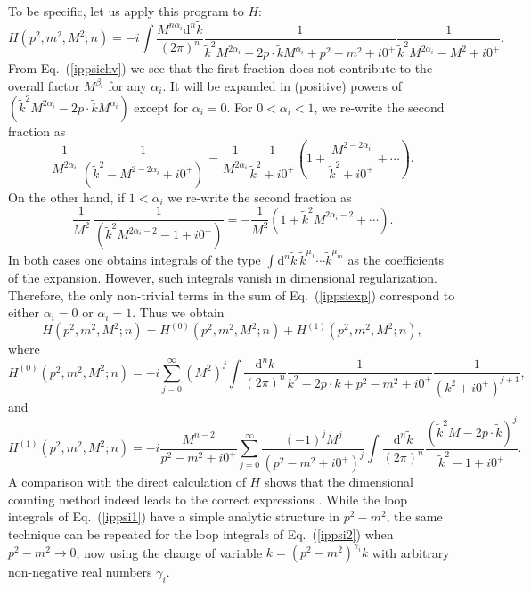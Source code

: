 \documentclass[twoside,12pt]{article}
\begin{document}
   To be specific, let us apply this program to $H$:
\begin{equation}
H(p^2,m^2,M^2;n) = -i\int\frac{M^{n \alpha_i} \mbox{d}^n\tilde k}{(2\pi)^n}
\frac{1}{\tilde k^2 M^{2 \alpha_i}-2 p\cdot\tilde k M^{\alpha_i}+ p^2-m^2+i0^+}
\frac{1}{\tilde k^2 M^{2 \alpha_i} -M^2+i0^+}. \label{ippsichv}
\end{equation}
   From Eq.~(\ref{ippsichv}) we see that the first fraction does
not contribute to the overall factor $M^{\beta_i}$ for any $\alpha_i$.
   It will be expanded in (positive) powers of $(\tilde k^2 M^{2\alpha_i}
-2 p\cdot \tilde k M^{\alpha_i})$ except for $\alpha_i=0$.
   For $0<\alpha_i<1$, we re-write the second fraction as
\begin{equation}
\frac{1}{M^{2 \alpha_i}} \ \frac{1}{(\tilde k^2-M^{2-2 \alpha_i}+i 0^+)}
=\frac{1}{M^{2 \alpha_i}}
\frac{1}{\tilde k^2+i0^+}\left(1+\frac{M^{2-2\alpha_i}}{\tilde k^2+i0^+}+\cdots
\right).
\label{1pr}
\end{equation}
   On the other hand, if $1<\alpha_i$ we re-write the second fraction as
\begin{equation}
\frac{1}{M^{2}} \ \frac{1}{(\tilde k^2 M^{2 \alpha_i-2}-1+i 0^+) }
=-\frac{1}{M^{2}}\left(1+\tilde k^2 M^{2 \alpha_i-2}+\cdots\right).
\label{1pr2}
\end{equation}
    In both cases one obtains integrals of the type
$\int \mbox{d}^n\tilde k \ \tilde k^{\mu_1}\cdots \tilde k^{\mu_m}$ as the coefficients of the
expansion.
   However, such integrals vanish in dimensional regularization.
   Therefore, the only non-trivial terms in the sum of Eq.~(\ref{ippsiexp})
correspond to either $\alpha_i=0$ or $\alpha_i=1$.
   Thus we obtain
\begin{equation}
H(p^2,m^2,M^2;n)=H^{(0)}(p^2,m^2,M^2;n)+H^{(1)}(p^2,m^2,M^2;n),
\label{ippsidecomp}
\end{equation}
where
\begin{equation}
H^{(0)}(p^2,m^2,M^2;n)=-i\sum_{j=0}^{\infty}
\left( M^2\right)^j \int \frac{\mbox{d}^n k}{(2\pi)^n}
\frac{1}{k^2 -2 p\cdot k+ p^2-m^2+i0^+}
\frac{1}{(k^2 +i0^+)^{j+1}},
\label{ippsi2}
\end{equation}
and
\begin{equation}
H^{(1)}(p^2,m^2,M^2;n)=-i \frac{M^{n-2}}{p^2-m^2+i0^+}
\sum_{j=0}^{\infty}
\frac{(-1)^j M^j}{(p^2-m^2+i0^+)^j}
\int\frac{\mbox{d}^n\tilde k}{(2\pi)^n} \frac{\left(\tilde k^2 M-2 p\cdot\tilde
k\right)^j}{\tilde k^2-1+i0^+}. \label{ippsi1}
\end{equation}
   A comparison with the direct calculation of $H$ shows that
the dimensional counting method indeed leads to the correct
expressions \cite{Gegelia:1994zz}.
   While the loop integrals of Eq.~(\ref{ippsi1}) have a simple
analytic structure in $p^2-m^2$, the same technique can
be repeated for the loop integrals of Eq.~(\ref{ippsi2}) when
$p^2-m^2\to 0$, now using the change of variable $k=(p^2-m^2)^{\gamma_i}
\tilde k$ with arbitrary non-negative real numbers $\gamma_i$.
\end{document}
